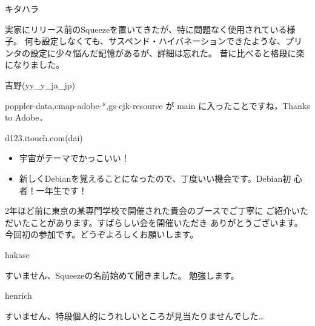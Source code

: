 
\begin{prework}{ キタハラ }

実家にリリース前のSqueezeを置いてきたが、特に問題なく使用されている様子。
何も設定しなくても、サスペンド・ハイバネーションできたような、プリンタの設定に少々悩んだ記憶があるが、詳細は忘れた。
昔に比べると格段に楽になりました。
\end{prework}

\begin{prework}{ 吉野(yy\_y\_ja\_jp) }

poppler-data,cmap-adobe-*,gs-cjk-resource が main に入ったことですね，Thanks to Adobe．
\end{prework}

\begin{prework}{ d123.itouch.com(dai) }

 \begin{itemize}
  \item 宇宙がテーマでかっこいい！
  \item 新しくDebianを覚えることになったので、丁度いい機会です。Debian初
	心者！一年生です！
 \end{itemize}

 2年ほど前に東京の某専門学校で開催された貴会のブースでご丁寧に
 ご紹介いただいたことがあります。すばらしい会を開催いただき
 ありがとうございます。今回初の参加です。どうぞよろしくお願いします。
\end{prework}

\begin{prework}{ hakase }

すいません、Squeezeの名前始めて聞きました。
勉強します。
\end{prework}

\begin{prework}{ henrich }

すいません、特段個人的にうれしいところが見当たりませんでした…
\end{prework}

